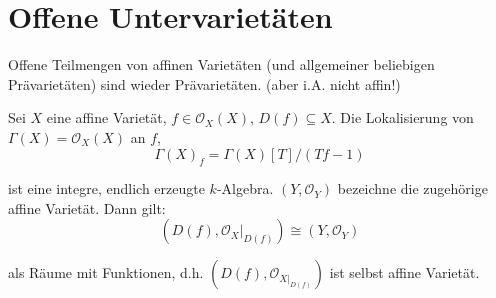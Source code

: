
\section{Offene Untervarietäten}
\label{sec:offene-untervarietaeten}

Offene Teilmengen von affinen Varietäten (und allgemeiner beliebigen
Prävarietäten) sind wieder Prävarietäten. (aber i.A. nicht affin!)
\begin{lem}[orig. 41]
  \label{lem:basisoffene-teilmengen-sind-affin}
  Sei $X$ eine affine Varietät, $f\in\mathcal{O}_{X}(X)$, $D(f)\subseteq X$. Die Lokalisierung
  von $\Gamma(X)=\mathcal{O}_{X}(X)$ an $f$,
  \[
    \Gamma(X)_{f}=\Gamma(X)[T]/(Tf-1)
  \]

  ist eine integre, endlich erzeugte $k$-Algebra. $(Y,\mathcal{O}_{Y})$
  bezeichne die zugehörige affine Varietät. Dann gilt:
  \[
    (D(f),\mathcal{O}_{X}|_{D(f)})\cong(Y,\mathcal{O}_{Y})
  \]

  als Räume mit Funktionen, d.h. $(D(f),\mathcal{O}_{X|_{D(f)}})$ ist
  selbst affine Varietät.
\end{lem}
